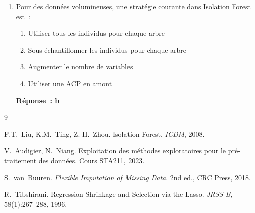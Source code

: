 \documentclass[a4paper,11pt]{article}
\theoremstyle{definition}
\theoremstyle{remark}
\begin{document}
\begin{enumerate}
  \item Pour des données volumineuses, une stratégie courante
    dans Isolation Forest est~:
    \begin{enumerate}
      \item Utiliser tous les individus pour chaque arbre
      \item Sous-échantillonner les individus pour chaque arbre
      \item Augmenter le nombre de variables
      \item Utiliser une ACP en amont
    \end{enumerate}
    \textbf{Réponse~: b}

\end{enumerate}

\begin{thebibliography}{9}

F.T.~Liu, K.M.~Ting, Z.-H.~Zhou.
\newblock Isolation Forest.
\newblock \emph{ICDM}, 2008.

V.~Audigier, N.~Niang.
\newblock Exploitation des méthodes exploratoires pour le pré-traitement
  des données.
\newblock Cours STA211, 2023.

S.~van~Buuren.
\newblock \emph{Flexible Imputation of Missing Data}.
\newblock 2nd ed., CRC Press, 2018.

R.~Tibshirani.
\newblock Regression Shrinkage and Selection via the Lasso.
\newblock \emph{JRSS B}, 58(1):267--288, 1996.

\end{thebibliography}
\end{document}
